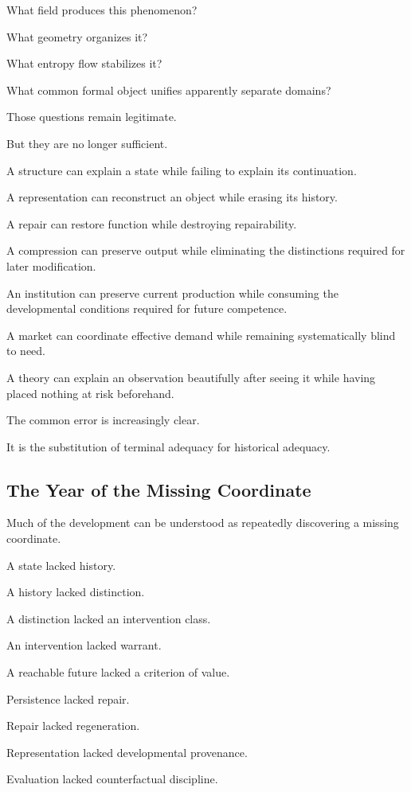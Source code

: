 \documentclass[11pt]{article}
\theoremstyle{remark}
\begin{document}
What field produces this phenomenon?

What geometry organizes it?

What entropy flow stabilizes it?

What common formal object unifies apparently separate domains?

Those questions remain legitimate.

But they are no longer sufficient.

A structure can explain a state while failing to explain its continuation.

A representation can reconstruct an object while erasing its history.

A repair can restore function while destroying repairability.

A compression can preserve output while eliminating the distinctions required
for later modification.

An institution can preserve current production while consuming the developmental
conditions required for future competence.

A market can coordinate effective demand while remaining systematically blind
to need.

A theory can explain an observation beautifully after seeing it while having
placed nothing at risk beforehand.

The common error is increasingly clear.

It is the substitution of terminal adequacy for historical adequacy.

\subsection{The Year of the Missing Coordinate}

Much of the development can be understood as repeatedly discovering a missing
coordinate.

A state lacked history.

A history lacked distinction.

A distinction lacked an intervention class.

An intervention lacked warrant.

A reachable future lacked a criterion of value.

Persistence lacked repair.

Repair lacked regeneration.

Representation lacked developmental provenance.

Evaluation lacked counterfactual discipline.
\end{document}
